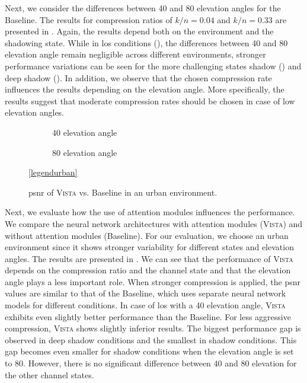 \documentclass[conference]{IEEEtran}
\newcommand\ours{\textsc{Vista}\xspace}
\newcommand\baseline{Baseline\xspace}
\begin{document}
Next, we consider the differences between 40\textdegree{} and 80\textdegree{} elevation angles for the \baseline. 
The results for compression ratios of $k/n = 0.04$ and $k/n = 0.33$ are presented in .
Again, the results depend both on the environment and the shadowing state.
While in \ac{los} conditions (), the differences between 40\textdegree{} and 80\textdegree{} elevation angle remain negligible across different environments, 
stronger performance variations can be seen for the more challenging states shadow () and deep shadow ().
In addition, we observe that the chosen compression rate influences the results depending on the elevation angle.
More specifically, the results suggest that moderate compression rates should be chosen in case of low elevation angles.


\begin{figure}
  \begin{subfigure}{.48\linewidth}
  \centering
  
  \caption{40\textdegree{} elevation angle}
\end{subfigure}
\hfill
\begin{subfigure}{.48\linewidth}
  \centering
  
  \caption{80\textdegree{} elevation angle}
\end{subfigure}

\vspace{1em}
\centering
\ref{legendurban}

\caption{\ac{psnr} of \ours vs. \baseline in an urban environment.}
\label{fig:af_vs_no_af}
\end{figure}

Next, we evaluate how the use of attention modules influences the performance.
We compare the neural network architectures with attention modules (\ours) and without attention modules (\baseline).
For our evaluation, we choose an urban environment since it shows stronger variability for different states and elevation angles.
The results are presented in .
We can see that the performance of \ours depends on the compression ratio and the channel state and that the elevation angle plays a less important role. 
When stronger compression is applied, the \ac{psnr} values are similar to that of the \baseline, which uses separate neural network models for different conditions. 
In case of \ac{los} with a 40\textdegree{} elevation angle, \ours exhibits even slightly better performance than the \baseline.
For less aggressive compression, \ours shows slightly inferior results.
The biggest performance gap is observed in deep shadow conditions and the smallest in shadow conditions. 
This gap becomes even smaller for shadow conditions when the elevation angle is set to 80\textdegree{}. 
However, there is no significant difference between 40\textdegree{} and 80\textdegree{} elevation for the other channel states.
\end{document}
